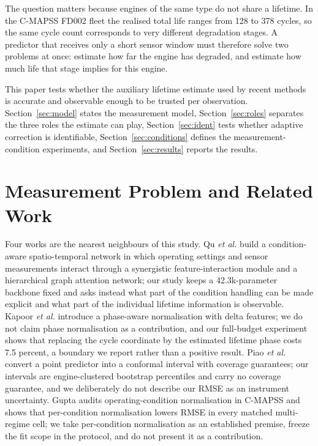 \documentclass[journal]{IEEEtran}
\begin{document}
The question matters because engines of the same type do not share a lifetime. In the C-MAPSS FD002 fleet the realised total life ranges from 128 to 378 cycles, so the same cycle count corresponds to very different degradation stages. A predictor that receives only a short sensor window must therefore solve two problems at once: estimate how far the engine has degraded, and estimate how much life that stage implies for this engine.

This paper tests whether the auxiliary lifetime estimate used by recent methods is accurate and observable enough to be trusted per observation. Section~\ref{sec:model} states the measurement model, Section~\ref{sec:roles} separates the three roles the estimate can play, Section~\ref{sec:ident} tests whether adaptive correction is identifiable, Section~\ref{sec:conditions} defines the measurement-condition experiments, and Section~\ref{sec:results} reports the results.

\section{Measurement Problem and Related Work}
Four works are the nearest neighbours of this study. Qu \emph{et al.} build a condition-aware spatio-temporal network in which operating settings and sensor measurements interact through a synergistic feature-interaction module and a hierarchical graph attention network; our study keeps a 42.3k-parameter backbone fixed and asks instead what part of the condition handling can be made explicit and what part of the individual lifetime information is observable. Kapoor \emph{et al.} introduce a phase-aware normalisation with delta features; we do not claim phase normalisation as a contribution, and our full-budget experiment shows that replacing the cycle coordinate by the estimated lifetime phase costs 7.5 percent, a boundary we report rather than a positive result. Piao \emph{et al.} convert a point predictor into a conformal interval with coverage guarantees; our intervals are engine-clustered bootstrap percentiles and carry no coverage guarantee, and we deliberately do not describe our RMSE as an instrument uncertainty. Gupta audits operating-condition normalisation in C-MAPSS and shows that per-condition normalisation lowers RMSE in every matched multi-regime cell; we take per-condition normalisation as an established premise, freeze the fit scope in the protocol, and do not present it as a contribution.
\end{document}
